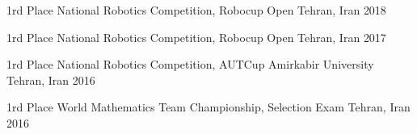 \begin{cvhonors}




\cvhonor
{1rd Place} %
{National Robotics Competition, Robocup Open} %
{Tehran, Iran} %
{2018} %


\cvhonor
{1rd Place} %
{National Robotics Competition, Robocup Open} %
{Tehran, Iran} %
{2017} %


\cvhonor
{1rd Place} %
{National Robotics Competition, AUTCup Amirkabir University} %
{Tehran, Iran} %
{2016} %


\cvhonor
{1rd Place} %
{World Mathematics Team Championship, Selection Exam} %
{Tehran, Iran} %
{2016} %


\end{cvhonors}
